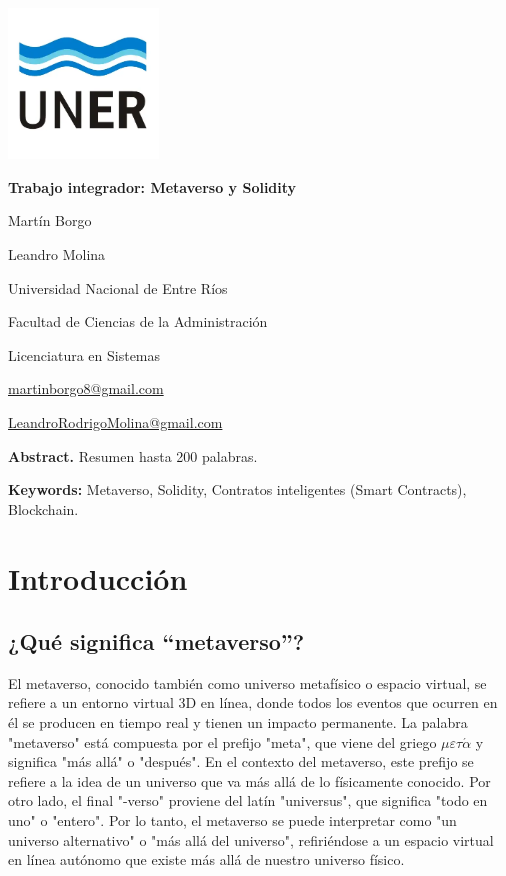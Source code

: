 \documentclass[a4paper,10pt]{article}
\begin{document}
	\pagestyle{empty}
	\begin{titlepage}
		\centering
		\vspace*{1.5cm}
		\includegraphics[width=0.3\textwidth]{unerlogo.png}
		\linebreak
		{\fontsize{14}{17}\bfseries Trabajo integrador: Metaverso y Solidity\par}
		{\small Martín Borgo\par}
		{\small Leandro Molina\par}
		{\normalsize Universidad Nacional de Entre Ríos\par}
		{\normalsize Facultad de Ciencias de la Administración\par}
		{\normalsize Licenciatura en Sistemas \par}
		{\small \href{mailto:martinborgo8@gmail.com}{martinborgo8@gmail.com}\par}
		{\small \href{mailto:LeandroRodrigoMolina@gmail.com}{LeandroRodrigoMolina@gmail.com}\par}
		
		{\small \textbf{Abstract.} Resumen hasta 200 palabras. \par}
		{\small \textbf{Keywords:} Metaverso, Solidity, Contratos inteligentes (Smart Contracts), Blockchain.\par}
	\end{titlepage}
	
	\tableofcontents
	\thispagestyle{empty}
	\section{Introducción}
	\subsection{¿Qué significa “metaverso”?}
	El metaverso, conocido también como universo metafísico o espacio virtual, se refiere a un entorno virtual 3D en línea, donde todos los eventos que ocurren en él se producen en tiempo real y tienen un impacto permanente. La palabra "metaverso" está compuesta por el prefijo "meta", que viene del griego \( \mu\varepsilon\tau\acute{\alpha} \) y significa "más allá" o "después". En el contexto del metaverso, este prefijo se refiere a la idea de un universo que va más allá de lo físicamente conocido. Por otro lado, el final "-verso" proviene del latín "universus", que significa "todo en uno" o "entero". Por lo tanto, el metaverso se puede interpretar como "un universo alternativo" o "más allá del universo", refiriéndose a un espacio virtual en línea autónomo que existe más allá de nuestro universo físico.
\end{document}
